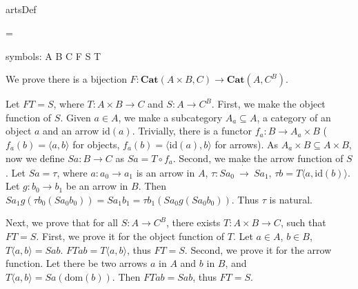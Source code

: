 \documentclass{article}
\newcounter{artCounter}
\newcounter{maxArts}
\newcommand{\showArt}{
\csname artsDef\roman{artCounter}\endcsname
\addtocounter{artCounter}{1}
\ifnum \value{artCounter}=\value{maxArts}
\setcounter{artCounter}{0}
\fi
}
\begin{document}
\subsubsection{}

\subsubsection{}

\subsubsection{}

\subsection{}

\subsubsection{}

\showArt

symbols: A B C F S T

We prove there is a bijection $F : \mathbf{Cat}(A \times B, C) \rightarrow \mathbf{Cat}(A, C^B)$.

Let $FT = S$, where $T : A \times B \rightarrow C$ and $S : A \rightarrow C^B$. First, we make the object function of $S$. Given $a \in A$, we make a subcategory $A_a \subseteq A$, a category of an object $a$ and an arrow $\mathrm{id}(a)$. Trivially, there is a functor $f_a : B \rightarrow A_a \times B$ ($f_a(b) = \langle a, b \rangle$ for objects, $f_a(b) = \langle \mathrm{id}(a), b \rangle$ for arrows). As $A_a \times B \subseteq A \times B$, now we define $Sa : B \rightarrow C$ as $Sa = T \circ f_a$. Second, we make the arrow function of $S$. Let $Sa = \tau$, where $a : a_0 \rightarrow a_1$ is an arrow in $A$, $\tau : S a_0\ \dot{\rightarrow}\ S a_1$, $\tau b = T\langle a, \mathrm{id}(b) \rangle$. Let $g : b_0 \rightarrow b_1$ be an arrow in $B$. Then $Sa_1g(\tau b_0(Sa_0b_0)) = Sa_1b_1 = \tau b_1(Sa_0g (Sa_0b_0))$. Thus $\tau$ is natural.

Next, we prove that for all $S : A \rightarrow C^B$, there exists $T : A \times B \rightarrow C$, such that $FT = S$. First, we prove it for the object function of $T$. Let $a \in A$, $b \in B$, $T\langle a, b \rangle = Sab$. $FTab = T\langle a, b \rangle$, thus $FT = S$. Second, we prove it for the arrow function. Let there be two arrows $a$ in $A$ and $b$ in $B$, and $T\langle a, b \rangle = Sa(\mathrm{dom}(b))$. Then $FTab = Sab$, thus $FT = S$.
\end{document}
